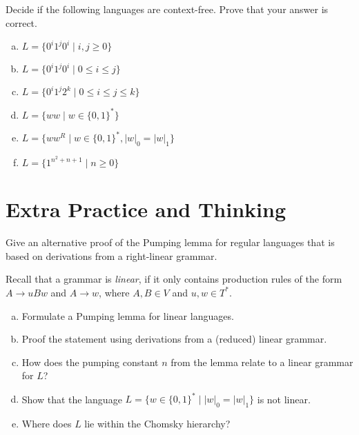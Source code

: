 \documentclass[a4paper,12pt]{amsart}
\begin{document}
\medskip\begin{problem}

    Decide if the following languages are context-free. Prove that your answer is correct.
    
    \begin{enumerate}[(a)]
        \setlength\itemsep{6pt}
        \item $L=\{0^i1^j0^i\mid i,j\geq 0\}$
        \item $L=\{0^i1^j0^i\mid 0\leq i\leq j\}$
        \item $L=\{0^i1^j2^k\mid 0\leq i\leq j\leq k\}$
        \item $L=\{ww\mid w\in \{0,1\}^*\}$
        \item $L=\{ww^R\mid w\in \{0,1\}^*, |w|_0=|w|_1\}$
        \item $L=\{1^{n^2+n+1}\mid n\geq 0\}$
    \end{enumerate}

\end{problem}


\section*{Extra Practice and Thinking}


\medskip\begin{problem}

    Give an alternative proof of the Pumping lemma for regular languages that is based on derivations from a right-linear grammar.

\end{problem}


\medskip\begin{problem}
    
    Recall that a grammar is \emph{linear}, if it only contains production rules of the form $A\to uBw$ and $A\to w$, where $A,B\in V$ and $u,w\in T^*$.
    
    \begin{enumerate}[(a)]
        \setlength\itemsep{6pt}
        \item Formulate a Pumping lemma for linear languages.
        \item Proof the statement using derivations from a (reduced) linear grammar.
        \item How does the pumping constant $n$ from the lemma relate to a linear grammar for $L$?
        \item Show that the language $L=\{w\in \{0,1\}^*\mid |w|_0=|w|_1\}$ is not linear.
        \item Where does $L$ lie within the Chomsky hierarchy?
    \end{enumerate}
    
\end{problem}
\end{document}
